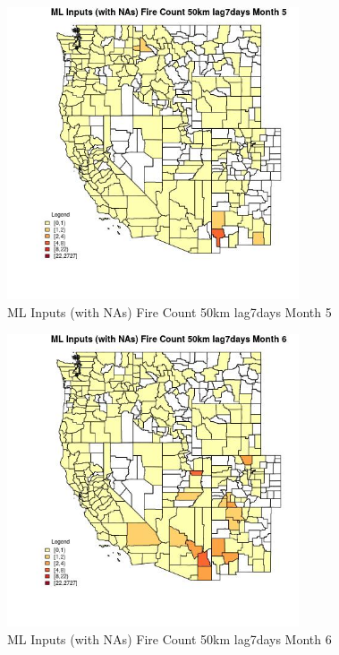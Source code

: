 \begin{figure} 
\centering  
\includegraphics[width=0.77\textwidth]{Code_Outputs/Report_ML_input_PM25_Step4_part_f_de_duplicated_aves_prioritize_24hr_obswNAs_CountyFire_Count_50km_lag7daysmedianMonth5.jpg} 
\caption{\label{fig:Report_ML_input_PM25_Step4_part_f_de_duplicated_aves_prioritize_24hr_obswNAsCountyFire_Count_50km_lag7daysmedianMonth5}ML Inputs (with NAs) Fire Count 50km lag7days Month 5} 
\end{figure} 
 

\begin{figure} 
\centering  
\includegraphics[width=0.77\textwidth]{Code_Outputs/Report_ML_input_PM25_Step4_part_f_de_duplicated_aves_prioritize_24hr_obswNAs_CountyFire_Count_50km_lag7daysmedianMonth6.jpg} 
\caption{\label{fig:Report_ML_input_PM25_Step4_part_f_de_duplicated_aves_prioritize_24hr_obswNAsCountyFire_Count_50km_lag7daysmedianMonth6}ML Inputs (with NAs) Fire Count 50km lag7days Month 6} 
\end{figure} 
 

